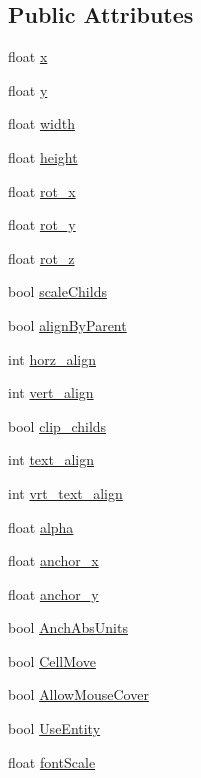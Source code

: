 \subsection*{Public Attributes}
\begin{DoxyCompactItemize}
\item 
float \hyperlink{class_n_g_u_i_text_drawer_afb2395d7c0cda3aa9843a7ee1d4393cd}{x}
\item 
float \hyperlink{class_n_g_u_i_text_drawer_a72a23eb11e446ffddebadd3c10b15a23}{y}
\item 
float \hyperlink{class_n_g_u_i_text_drawer_a80c1d4fd7c92d417c610e4e4424ac6d2}{width}
\item 
float \hyperlink{class_n_g_u_i_text_drawer_a25f6ccd2d0751bc4bcc7ba8ac6852844}{height}
\item 
float \hyperlink{class_n_g_u_i_text_drawer_a3a78c83ca5ea0998147a1783da70165a}{rot\+\_\+x}
\item 
float \hyperlink{class_n_g_u_i_text_drawer_ac8f4c18616190bf1abb543e817570262}{rot\+\_\+y}
\item 
float \hyperlink{class_n_g_u_i_text_drawer_abd67a7f8f4171b3d0be9d3d95d4c1a4e}{rot\+\_\+z}
\item 
bool \hyperlink{class_n_g_u_i_text_drawer_a9471d631e854d0f29f514491df8d0ede}{scale\+Childs}
\item 
bool \hyperlink{class_n_g_u_i_text_drawer_af2ba553969c90c36d9bde4a5cd7aff6f}{align\+By\+Parent}
\item 
int \hyperlink{class_n_g_u_i_text_drawer_aa4c81a138e5e11957add4db6e324c126}{horz\+\_\+align}
\item 
int \hyperlink{class_n_g_u_i_text_drawer_ad936996af18eea907348fdc22f296cf2}{vert\+\_\+align}
\item 
bool \hyperlink{class_n_g_u_i_text_drawer_adf70a19ee0971b6872ceea8e5ea95f4c}{clip\+\_\+childs}
\item 
int \hyperlink{class_n_g_u_i_text_drawer_aa6ad1e2483f2a46361abe6a24da5bc80}{text\+\_\+align}
\item 
int \hyperlink{class_n_g_u_i_text_drawer_a58a9a9b356ca1c4d2848f88431492639}{vrt\+\_\+text\+\_\+align}
\item 
float \hyperlink{class_n_g_u_i_text_drawer_a4730f4bf9cacc7e9fce124c88ef6ec87}{alpha}
\item 
float \hyperlink{class_n_g_u_i_text_drawer_ac7fb0a42cf041c2e80018439bc5d9762}{anchor\+\_\+x}
\item 
float \hyperlink{class_n_g_u_i_text_drawer_a64a44368ea9d1f228346985e225335fe}{anchor\+\_\+y}
\item 
bool \hyperlink{class_n_g_u_i_text_drawer_ae75ba22ccebc754adf4a08375a08921e}{Anch\+Abs\+Units}
\item 
bool \hyperlink{class_n_g_u_i_text_drawer_a617b09f6e9068a0cb9962ed8dfbe5f1e}{Cell\+Move}
\item 
bool \hyperlink{class_n_g_u_i_text_drawer_a56e8f928345026681e575207e78b716f}{Allow\+Mouse\+Cover}
\item 
bool \hyperlink{class_n_g_u_i_text_drawer_aa3d6ddf9addecadb4c544e2d212a7100}{Use\+Entity}
\item 
float \hyperlink{class_n_g_u_i_text_drawer_a6e5863db62ff5754e8486a519e6b414e}{font\+Scale}
\end{DoxyCompactItemize}
